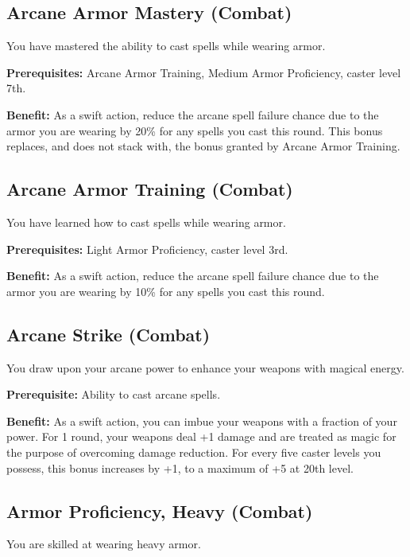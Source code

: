 \subsection{Arcane Armor Mastery (Combat)}

				
You have mastered the ability to cast spells while wearing armor.
				
\textbf{Prerequisites:} Arcane Armor Training, Medium Armor Proficiency, caster level 7th.
				
\textbf{Benefit:} As a swift action, reduce the arcane spell failure chance due to the armor you are wearing by 20\% for any spells you cast this round. This bonus replaces, and does not stack with, the bonus granted by Arcane Armor Training.
				
\subsection{Arcane Armor Training (Combat)}

				
You have learned how to cast spells while wearing armor.
				
\textbf{Prerequisites:} Light Armor Proficiency, caster level 3rd.
				
\textbf{Benefit:} As a swift action, reduce the arcane spell failure chance due to the armor you are wearing by 10\% for any spells you cast this round.
				
\subsection{Arcane Strike (Combat)}

				
You draw upon your arcane power to enhance your weapons with magical energy.
				
\textbf{Prerequisite:} Ability to cast arcane spells.
				
\textbf{Benefit:} As a swift action, you can imbue your weapons with a fraction of your power. For 1 round, your weapons deal +1 damage and are treated as magic for the purpose of overcoming damage reduction. For every five caster levels you possess, this bonus increases by +1, to a maximum of +5 at 20th level.
				
\subsection{Armor Proficiency, Heavy (Combat)}

				
You are skilled at wearing heavy armor.
				
